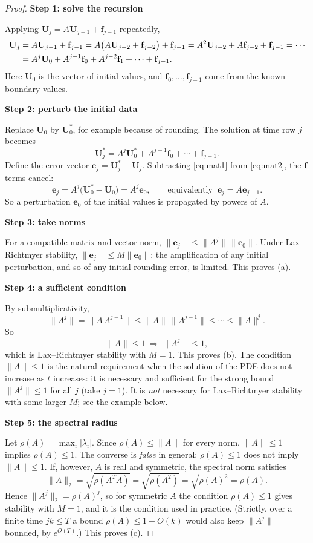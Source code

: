 \documentclass[11pt,a4paper]{article}
\numberwithin{equation}{section}
\theoremstyle{spacedplain}
\theoremstyle{spaceddefinition}
\theoremstyle{spacedremark}
\newcommand{\step}[1]{\par\addvspace{0.6em}\noindent\textbf{#1}\par\nobreak}
\begin{document}
\begin{proof}\leavevmode
\step{Step 1: solve the recursion}
Applying
\(\mathbf U_{j}=A\mathbf U_{j-1}+\mathbf f_{j-1}\) repeatedly,
\begin{align}
  \mathbf U_j
  &=A\mathbf U_{j-1}+\mathbf f_{j-1}
   =A\bigl(A\mathbf U_{j-2}+\mathbf f_{j-2}\bigr)+\mathbf f_{j-1}
   =A^2\mathbf U_{j-2}+A\mathbf f_{j-2}+\mathbf f_{j-1}
   =\cdots\notag\\
  &=A^j\mathbf U_0+A^{j-1}\mathbf f_0+A^{j-2}\mathbf f_1+\cdots
    +\mathbf f_{j-1}. \label{eq:mat1}
\end{align}
Here \(\mathbf U_0\) is the vector of initial values, and
\(\mathbf f_0,\dots,\mathbf f_{j-1}\) come from the known boundary
values.

\step{Step 2: perturb the initial data}
Replace \(\mathbf U_0\) by
\(\mathbf U_0^*\), for example because of rounding.  The solution at
time row \(j\) becomes
\begin{equation}\label{eq:mat2}
  \mathbf U_j^*=A^j\mathbf U_0^*+A^{j-1}\mathbf f_0+\cdots
                +\mathbf f_{j-1}.
\end{equation}
Define the error vector \(\mathbf e_j=\mathbf U_j^*-\mathbf U_j\).
Subtracting \eqref{eq:mat1} from \eqref{eq:mat2}, the \(\mathbf f\)
terms cancel:
\[
  \boxed{\mathbf e_j=A^j\bigl(\mathbf U_0^*-\mathbf U_0\bigr)
         =A^j\mathbf e_0},
  \qquad\text{equivalently }\ \mathbf e_j=A\mathbf e_{j-1}.
\]
So a perturbation \(\mathbf e_0\) of the initial values is propagated
by powers of \(A\).

\step{Step 3: take norms}
For a compatible matrix and vector norm,
\(\|\mathbf e_j\|\le\|A^j\|\,\|\mathbf e_0\|\).  Under Lax--Richtmyer
stability, \(\|\mathbf e_j\|\le M\|\mathbf e_0\|\): the amplification
of any initial perturbation, and so of any initial rounding error, is
limited.  This proves (a).

\step{Step 4: a sufficient condition}
By submultiplicativity,
\[
  \|A^j\|=\|A\,A^{j-1}\|\le\|A\|\,\|A^{j-1}\|\le\cdots\le\|A\|^j.
\]
So
\[
  \boxed{\|A\|\le1}\ \Longrightarrow\ \|A^j\|\le1,
\]
which is Lax--Richtmyer stability with \(M=1\).  This proves (b).  The
condition \(\|A\|\le1\) is the natural requirement when the solution of
the PDE does not increase as \(t\) increases: it is necessary and
sufficient for the strong bound \(\|A^j\|\le1\) for all \(j\) (take
\(j=1\)).  It is \emph{not} necessary for Lax--Richtmyer stability with
some larger \(M\); see the example below.

\step{Step 5: the spectral radius}
Let \(\rho(A)=\max_i|\lambda_i|\).
Since \(\rho(A)\le\|A\|\) for every norm, \(\|A\|\le1\) implies
\(\rho(A)\le1\).  The converse is \emph{false} in general:
\(\rho(A)\le1\) does not imply \(\|A\|\le1\).  If, however, \(A\) is
real and symmetric, the spectral norm satisfies
\[
  \|A\|_2=\sqrt{\rho(A^TA)}=\sqrt{\rho(A^2)}=\sqrt{\rho(A)^2}=\rho(A).
\]
Hence \(\|A^j\|_2=\rho(A)^j\), so for symmetric \(A\) the condition
\(\rho(A)\le1\) gives stability with \(M=1\), and it is the condition
used in practice.  (Strictly, over a finite time \(jk\le T\) a bound
\(\rho(A)\le1+O(k)\) would also keep \(\|A^j\|\) bounded, by
\(e^{O(T)}\).)  This proves (c).
\end{proof}
\end{document}
